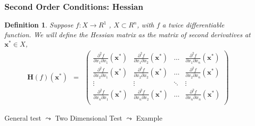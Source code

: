 \documentclass[handout]{beamer}
\newtheorem{defn}{Definition}
\numberwithin{equation}{section}
\begin{document}
\begin{frame}
\frametitle{Second Order Conditions: Hessian}


\begin{defn}
Suppose $f:X \rightarrow R^{1}$ , $X \subset R^{n}$, with $f$ a twice differentiable function.  We will define the Hessian matrix as the matrix of second derivatives at $\boldsymbol{x}^{*} \in X$,
\begin{eqnarray}
\boldsymbol{H}(f)(\boldsymbol{x}^{*} )  & = & \begin{pmatrix} 
		\frac{\partial^{2} f }{\partial x_{1} \partial x_{1} } (\boldsymbol{x}^{*} ) & \frac{\partial^{2} f }{\partial x_{1} \partial x_{2} } (\boldsymbol{x}^{*} ) & \hdots & \frac{\partial^{2} f }{\partial x_{1} \partial x_{n} } (\boldsymbol{x}^{*} ) \\
		\frac{\partial^{2} f }{\partial x_{2} \partial x_{1} } (\boldsymbol{x}^{*} ) & \frac{\partial^{2} f }{\partial x_{2} \partial x_{2} } (\boldsymbol{x}^{*} ) & \hdots & \frac{\partial^{2} f }{\partial x_{2} \partial x_{n} } (\boldsymbol{x}^{*} ) \\
		\vdots & \vdots & \ddots & \vdots \\
		\frac{\partial^{2} f }{\partial x_{n} \partial x_{1} } (\boldsymbol{x}^{*} ) & \frac{\partial^{2} f }{\partial x_{n} \partial x_{2} } (\boldsymbol{x}^{*} ) & \hdots & \frac{\partial^{2} f }{\partial x_{n} \partial x_{n} } (\boldsymbol{x}^{*} ) \\
\end{pmatrix} \nonumber 
\end{eqnarray}

\end{defn} \pause	
								
General test $\leadsto$ Two Dimensional Test $\leadsto$ Example

\end{frame}
\end{document}
